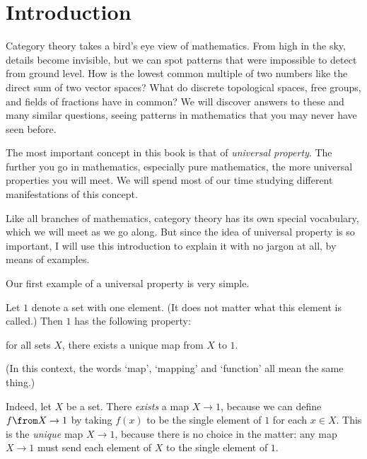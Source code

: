 % 
% 
% 

\chapter*{Introduction}
\label{ch:intro}

Category theory takes a bird's eye view of mathematics.  From high in the sky,
details become invisible, but we can spot patterns that were impossible to
detect from ground level.  How is the lowest common multiple of two numbers
like the direct sum of two vector spaces?  What do discrete topological
spaces, free groups, and fields of fractions have in common?  We will
discover answers to these and many similar questions, seeing patterns in
mathematics that you may never have seen before.

The most important concept in this book is that of \emph{universal%
%
%
property}.  The further you go in mathematics, especially pure mathematics,
the more universal properties you will meet.  We will spend most of our
time studying different manifestations of this concept.

Like all branches of mathematics, category theory has its own special
vocabulary, which we will meet as we go along.  But since the idea of
universal property is so important, I will use this introduction to explain
it with no jargon at all, by means of examples.

Our first example of a universal property is very simple.

\begin{iexample}
\label{eg:univ-terminal-set}
Let $1$%
%
%
denote a set with one%
%
%
element.  (It does not matter what this element is called.)  Then $1$ has
the following property:
% 
\begin{displaytext}
for all sets $X$, there exists a unique map from $X$ to $1$.
\end{displaytext}
% 
(In this context, the words `map', `mapping' and `function' all mean the
same thing.)

Indeed, let $X$ be a set.  There \emph{exists} a map $X \to 1$, because we
can define $f\from X \to 1$ by taking $f(x)$ to be the single element of
$1$ for each $x \in X$.  This is the \emph{unique} map $X \to 1$, because
there is no choice in the matter: any map $X \to 1$ must send each element
of $X$ to the single element of $1$.
\end{iexample}

